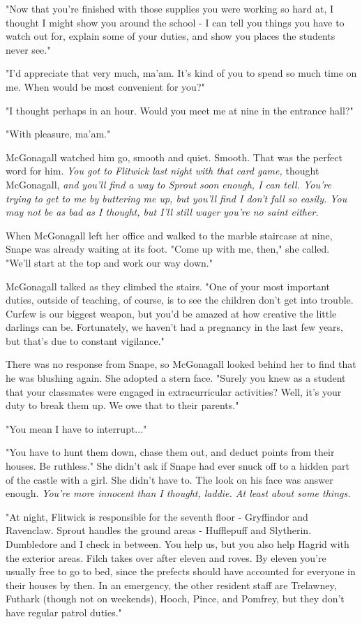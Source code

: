 \documentclass[a4paper,11pt]{article}
\begin{document}
"Now that you're finished with those supplies you were working so hard at, I thought I might show you around the school - I can tell you things you have to watch out for, explain some of your duties, and show you places the students never see."

"I'd appreciate that very much, ma'am. It's kind of you to spend so much time on me. When would be most convenient for you?"

"I thought perhaps in an hour. Would you meet me at nine in the entrance hall?"

"With pleasure, ma'am."

McGonagall watched him go, smooth and quiet. Smooth. That was the perfect word for him. \emph{You got to Flitwick last night with that card game,} thought McGonagall, \emph{and you'll find a way to Sprout soon enough, I can tell. You're trying to get to me by buttering me up, but you'll find I don't fall so easily. You may not be as bad as I thought, but I'll still wager you're no saint either.}

When McGonagall left her office and walked to the marble staircase at nine, Snape was already waiting at its foot. "Come up with me, then," she called. "We'll start at the top and work our way down."

McGonagall talked as they climbed the stairs. "One of your most important duties, outside of teaching, of course, is to see the children don't get into trouble. Curfew is our biggest weapon, but you'd be amazed at how creative the little darlings can be. Fortunately, we haven't had a pregnancy in the last few years, but that's due to constant vigilance."

There was no response from Snape, so McGonagall looked behind her to find that he was blushing again. She adopted a stern face. "Surely you knew as a student that your classmates were engaged in extracurricular activities? Well, it's your duty to break them up. We owe that to their parents."

"You mean I have to interrupt..."

"You have to hunt them down, chase them out, and deduct points from their houses. Be ruthless." She didn't ask if Snape had ever snuck off to a hidden part of the castle with a girl. She didn't have to. The look on his face was answer enough. \emph{You're more innocent than I thought, laddie. At least about some things.}

"At night, Flitwick is responsible for the seventh floor - Gryffindor and Ravenclaw. Sprout handles the ground areas - Hufflepuff and Slytherin. Dumbledore and I check in between. You help us, but you also help Hagrid with the exterior areas. Filch takes over after eleven and roves. By eleven you're usually free to go to bed, since the prefects should have accounted for everyone in their houses by then. In an emergency, the other resident staff are Trelawney, Futhark (though not on weekends), Hooch, Pince, and Pomfrey, but they don't have regular patrol duties."
\end{document}
